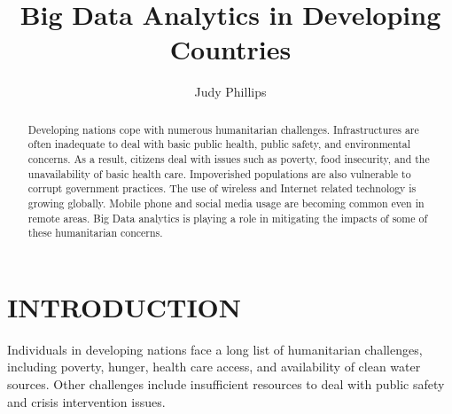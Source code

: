 \documentclass[sigconf]{acmart}
\begin{document}
\title{Big Data Analytics in Developing Countries}


\author{Judy Phillips}

\renewcommand{\shortauthors}{B. Trovato et al.}


\begin{abstract}
Developing nations cope with numerous humanitarian challenges. Infrastructures are often inadequate to deal with basic public health, public safety, and environmental concerns. As a result, citizens deal with issues such as poverty, food insecurity, and the unavailability of basic health care. Impoverished populations are also vulnerable to corrupt government practices. The use of wireless and Internet related technology is growing globally. Mobile phone and social media usage are becoming common even in remote areas. Big Data analytics is playing a role in mitigating the impacts of some of these humanitarian concerns. 
\end{abstract}



\maketitle

\section{INTRODUCTION}

Individuals in developing nations face a long list of humanitarian challenges, including poverty, hunger, health care access, and availability of clean water sources. Other challenges include insufficient resources to deal with public safety and crisis intervention issues.
\end{document}
